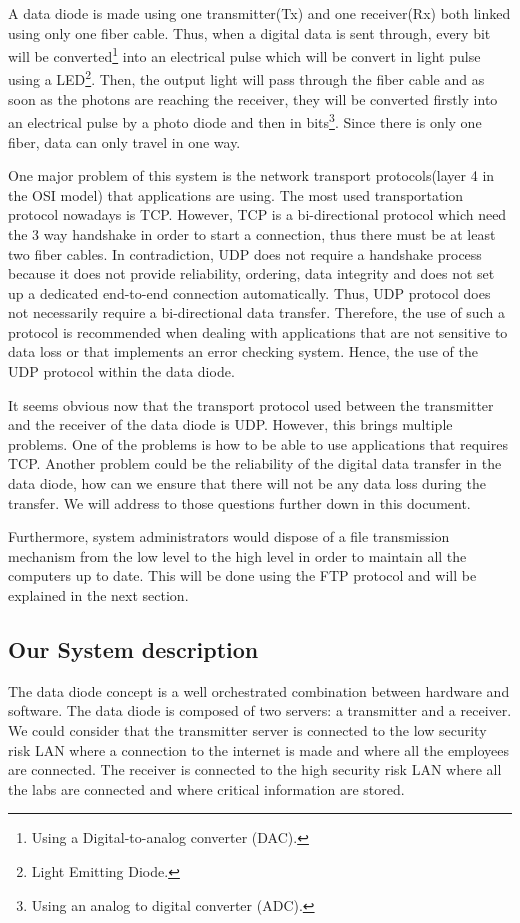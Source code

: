 \documentclass[a4paper,10pt]{article}
\begin{document}
A data diode is made using one transmitter(Tx) and one receiver(Rx) both linked using only one fiber cable. Thus, when a digital data is sent through, every bit will be converted\footnote{Using a Digital-to-analog converter (DAC).} into an electrical pulse which will be convert in light pulse using a LED\footnote{Light Emitting Diode.}. Then, the output light will pass through the fiber cable and as soon as the photons are reaching the receiver, they will be converted firstly into an electrical pulse by a photo diode and then in bits\footnote{Using an analog to digital converter (ADC).}. Since there is only one fiber, data can only travel in one way.

One major problem of this system is the network transport protocols(layer 4 in the OSI model) that applications are using. The most used transportation protocol nowadays is TCP. However, TCP is a bi-directional protocol which need the 3 way handshake in order to start a connection, thus there must be at least two fiber cables. In contradiction, UDP does not require a handshake process because it does not provide reliability, ordering, data integrity and does not set up a dedicated end-to-end connection automatically. Thus, UDP protocol does not necessarily require a bi-directional data transfer. Therefore, the use of such a protocol is recommended when dealing with applications that are not sensitive to data loss or that implements an error checking system. Hence, the use of the UDP protocol within the data diode.

It seems obvious now that the transport protocol used between the transmitter and the receiver of the data diode is UDP. However, this brings multiple problems. One of the problems is how to be able to use applications that requires TCP. Another problem could be the reliability of the digital data transfer in the data diode, how can we ensure that there will not be any data loss during the transfer. We will address to those questions further down in this document.\bigskip

Furthermore, system administrators would dispose of a file transmission mechanism from the low level to the high level in order to maintain all the computers up to date. This will be done using the FTP protocol and will be explained in the next section.

\subsection{Our System description}
The data diode concept is a well orchestrated combination between hardware and software. The data diode is composed of two servers: a transmitter and a receiver. We could consider that the transmitter server is connected to the low security risk LAN where a connection to the internet is made and where all the employees are connected. The receiver is connected to the high security risk LAN where all the labs are connected and where critical information are stored.
\end{document}
